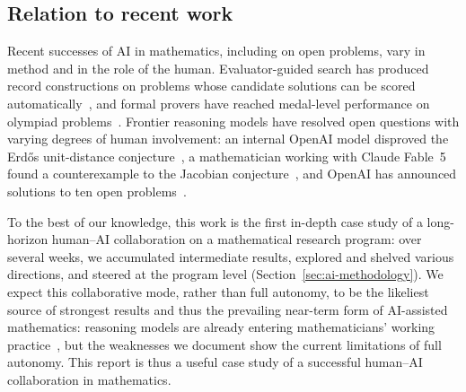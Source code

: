 \subsection{Relation to recent work}

Recent successes of AI in mathematics, including on open problems, vary
in method and in the role of the human. Evaluator-guided search has
produced record constructions on problems whose candidate solutions can
be scored
automatically~\cite{funsearch,novikov2025alphaevolvecodingagentscientific,charton2024patternboostconstructionsmathematicslittle},
and formal provers have reached medal-level performance on olympiad
problems~\cite{hubert2026alphaproof}. Frontier reasoning models have
resolved open questions with varying degrees of human involvement: an
internal OpenAI model disproved the Erd\H{o}s unit-distance
conjecture~\cite{openai2026planarpointsets}, a mathematician working with
Claude Fable~5 found a counterexample to the Jacobian
conjecture~\cite{jacobian}, and OpenAI has announced solutions to ten
open problems~\cite{openai2026ten}.


To the best of our knowledge, this work is the first in-depth case study of a long-horizon human--AI collaboration on a mathematical research program:
over several weeks, we accumulated intermediate results, explored and shelved various directions, and steered at the program level (Section~\ref{sec:ai-methodology}).
We expect this collaborative mode, rather than
full autonomy,
to be the likeliest source of strongest results and thus the prevailing near-term form of AI-assisted mathematics:
reasoning models are already entering mathematicians' working practice~\cite{bubeck2025science}, but the weaknesses we document show the current limitations of full autonomy.
This report is thus a useful case study of a successful human--AI collaboration in mathematics.


